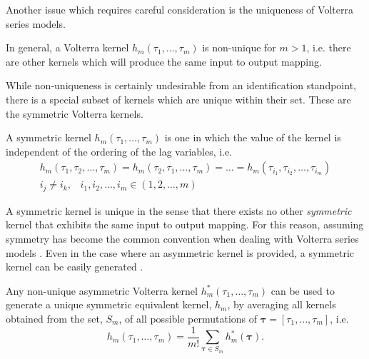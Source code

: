 Another issue which requires careful consideration is the uniqueness of Volterra series models.
\begin{property}
In general, a Volterra kernel $h_m(\tau_1, \hdots, \tau_m)$ is non-unique for $m > 1$, i.e. there are other kernels which will produce the same input to output mapping.
\end{property}
While non-uniqueness is certainly undesirable from an identification standpoint, there is a special subset of kernels which are unique within their set. These are the symmetric Volterra kernels.  
\begin{defn}[Symmetry]
A symmetric kernel $h_m(\tau_1, \hdots, \tau_m)$ is one in which the value of the kernel is independent of the ordering of the lag variables, i.e.
\begin{align}
h_m(\tau_1, \tau_2, \hdots, \tau_m) = h_m(\tau_2, \tau_1, \hdots, \tau_m) = \hdots = h_m(\tau_{i_1}, \tau_{i_2}, \hdots, \tau_{i_m}) \\
i_j \neq i_k, \; \; \; i_1, i_2, \hdots, i_m \in (1,2,\hdots,m) \nonumber
\end{align}
\end{defn}
A symmetric kernel is unique in the sense that there exists no other \emph{symmetric} kernel that exhibits the same input to output mapping. For this reason, assuming symmetry has become the common convention when dealing with Volterra series models \cite{Cheng2017}. Even in the case where an asymmetric kernel is provided, a symmetric kernel can be easily generated \cite{Schetzen1980}.
\begin{property}
Any non-unique asymmetric Volterra kernel $h_m^*(\tau_1, \hdots, \tau_m)$ can be used to generate a unique symmetric equivalent kernel, $h_m$, by averaging all kernels obtained from the set, $S_m$, of all possible permutations of $\bm{\tau}=[\tau_1,\hdots,\tau_m]$, i.e.
\begin{equation}
h_m(\tau_1, \hdots, \tau_m) = \frac{1}{m!} \sum_{\bm{\tau} \in S_m} h_m^*(\bm{\tau}).
\end{equation}
\end{property}

